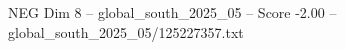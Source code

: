 \begin{textsample}{NEG Dim 8 – global\_south\_2025\_05 – Score -2.00 – global\_south\_2025\_05/125227357.txt}
\end{textsample}
